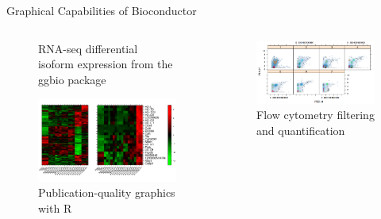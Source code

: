 \documentclass[final]{beamer}
\begin{document}
\begin{frame}[t]
\begin{columns}[t]
\begin{column}{0.48\linewidth}
\begin{block}{Graphical Capabilities of Bioconductor}
\begin{columns}[t]
\begin{column}{0.33\linewidth}
\begin{figure}
              \caption{RNA-seq differential isoform expression from the ggbio package}
            \end{figure}
            \begin{figure}
              \centering
              \includegraphics[width=0.85\linewidth]{heatmapPanels}
              \caption{Publication-quality graphics with R}
            \end{figure}
          \end{column}
          \begin{column}{0.33\linewidth}
            \begin{figure}
              \centering
              \includegraphics[width=0.85\linewidth]{flowFilter}
              \caption{Flow cytometry filtering and quantification}
            \end{figure}
            \begin{figure}
              \centering

\end{figure}
\end{column}
\end{columns}
\end{block}
\end{column}
\end{columns}
\end{frame}
\end{document}
